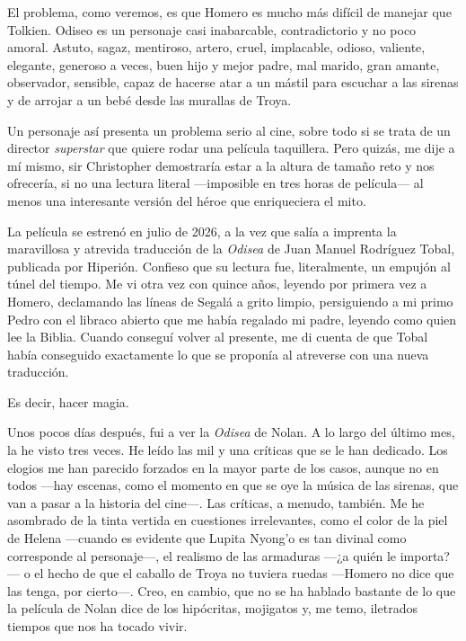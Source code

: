 El problema, como veremos, es que Homero es mucho más difícil de manejar que Tolkien. Odiseo es un personaje casi inabarcable, contradictorio y no poco amoral. Astuto, sagaz, mentiroso, artero, cruel, implacable, odioso, valiente, elegante, generoso a veces, buen hijo y mejor padre, mal marido, gran amante, observador, sensible, capaz de hacerse atar a un mástil para escuchar a las sirenas y de arrojar a un bebé desde las murallas de Troya.

Un personaje así presenta un problema serio al cine, sobre todo si se trata de un director \emph{superstar} que quiere rodar una película taquillera. Pero quizás, me dije a mí mismo, sir Christopher demostraría estar a la altura de tamaño reto y nos ofrecería, si no una lectura literal ---imposible en tres horas de película--- al menos una interesante versión del héroe que enriqueciera el mito.

La película se estrenó en julio de 2026, a la vez que salía a imprenta la maravillosa y atrevida traducción de la \emph{Odisea} de Juan Manuel Rodríguez Tobal, publicada por Hiperión. Confieso que su lectura fue, literalmente, un empujón al túnel del tiempo. Me vi otra vez con quince años, leyendo por primera vez a Homero, declamando las líneas de Segalá a grito limpio, persiguiendo a mi primo Pedro con el libraco abierto que me había regalado mi padre, leyendo como quien lee la Biblia. Cuando conseguí volver al presente, me di cuenta de que Tobal había conseguido exactamente lo que se proponía al atreverse con una nueva traducción.

Es decir, hacer magia.

Unos pocos días después, fui a ver la \emph{Odisea} de Nolan. A lo largo del último mes, la he visto tres veces. He leído las mil y una críticas que se le han dedicado. Los elogios me han parecido forzados en la mayor parte de los casos, aunque no en todos ---hay escenas, como el momento en que se oye la música de las sirenas, que van a pasar a la historia del cine---. Las críticas, a menudo, también. Me he asombrado de la tinta vertida en cuestiones irrelevantes, como el color de la piel de Helena ---cuando es evidente que Lupita Nyong'o es tan divinal como corresponde al personaje---, el realismo de las armaduras ---¿a quién le importa?--- o el hecho de que el caballo de Troya no tuviera ruedas ---Homero no dice que las tenga, por cierto---. Creo, en cambio, que no se ha hablado bastante de lo que la película de Nolan dice de los hipócritas, mojigatos y, me temo, iletrados tiempos que nos ha tocado vivir.

